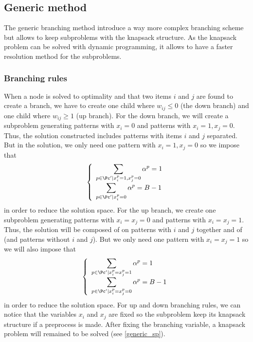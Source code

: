 \subsection{Generic method}
\label{generic}

The generic branching method introduce a way more complex branching scheme but allows to keep subproblems with the knapsack structure. As the knapsack problem can be solved with dynamic programming, it allows to have a faster resolution method for the subproblems.

\subsubsection{Branching rules}

When a node is solved to optimality and that two items $i$ and $j$ are found to create a branch, we have to create one child where $w_{ij} \leq 0$ (the down branch) and one child where $w_{ij} \geq 1$ (up branch). For the down branch, we will create a subproblem generating patterns with $x_i = 0$ and patterns with $x_i = 1, x_j=0$. Thus, the solution constructed includes patterns with items $i$ and $j$ separated. But in the solution, we only need one pattern with $x_i = 1, x_j=0$ so we impose that 
\begin{equation}
	\label{generic-down}
	\left \{
	\begin{array}{l}
	\displaystyle \sum_{p \in \Pc' | x_i^p=1, x_j^p=0} \alpha^p = 1 \\
	\displaystyle \sum_{p \in \Pc' | x_i^p=0} \alpha^p = B-1 \\
	\end{array}
	\right.
\end{equation}
in order to reduce the solution space. For the up branch, we create one subproblem generating patterns with $x_i = x_j = 0$ and patterns with $x_i = x_j = 1$. Thus, the solution will be composed of on patterns with $i$ and $j$ together and of (and patterns without $i$ and $j$). But we only need one pattern with $x_i = x_j = 1$ so we will also impose that
\begin{equation}	
	\label{generic-up}
	\left \{
	\begin{array}{l}
	\displaystyle \sum_{p \in \Pc' | x_i^p= x_j^p=1} \alpha^p = 1 \\
	\displaystyle \sum_{p \in \Pc' | x_i^p= x_j^p=0} \alpha^p = B-1 \\
	\end{array}
	\right.
\end{equation}
in order to reduce the solution space. For up and down branching rules, we can notice that the variables $x_i$ and $x_j$ are fixed so the subproblem keep its knapsack structure if a preprocess is made. After fixing the branching variable, a knapsack problem will remained to be solved (see \ref{generic_sp}).

